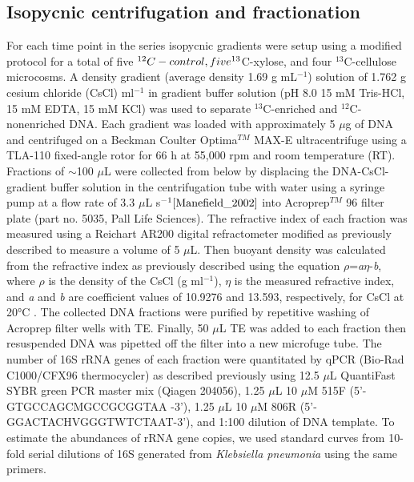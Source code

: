 \subsection{Isopycnic centrifugation and fractionation}
For each time point in the series isopycnic gradients were setup using
a modified protocol \cite{Neufeld_2007} for a total of five
$^{12}C-control, five \textsuperscript{13}$C-xylose, and four
$^{13}$C-cellulose microcosms. A density gradient (average density
1.69 g mL$^{-1}$) solution of 1.762 g cesium chloride (CsCl)
ml$^{-1}$ in gradient buffer solution (pH 8.0 15 mM Tris-HCl, 15
mM EDTA, 15 mM KCl) was used to separate $^{13}$C-enriched and
$^{12}$C-nonenriched DNA. Each gradient was loaded with
approximately 5 $\mu$g of DNA and centrifuged on a Beckman Coulter
Optima$^{TM}$ MAX-E ultracentrifuge using a TLA-110 fixed-angle
rotor for 66 h at 55,000 rpm and room temperature (RT). Fractions of $\sim$100
$\mu$L were collected from below by displacing the DNA-CsCl-gradient buffer
solution in the centrifugation tube with water using a syringe pump at a flow
rate of 3.3 $\mu$L s$^{-1} \cite{Manefield_2002}$ into
Acroprep$^{TM}$ 96 filter plate (part no. 5035, Pall Life
Sciences). The refractive index of each fraction was measured using a Reichart
AR200 digital refractometer modified as previously described
\cite{Buckley_2007} to measure a volume of 5 $\mu$L. Then buoyant density was
calculated from the refractive index as previously described
\cite{Buckley_2007} using the equation $\rho$=\textit{a}$\eta$-\textit{b},
where $\rho$ is the density of the CsCl (g ml$^{-1}$), $\eta$ is
the measured refractive index, and \textit{a} and \textit{b} are coefficient
values of 10.9276 and 13.593, respectively, for CsCl at 20°C
\cite{9780408708036}. The collected DNA fractions were purified by repetitive
washing of Acroprep filter wells with TE. Finally, 50 $\mu$L TE was added to
each fraction then resuspended DNA was pipetted off the filter into a new
microfuge tube. The number of 16S rRNA genes of each fraction were quantitated
by qPCR (Bio-Rad C1000/CFX96 thermocycler) as described previously
\cite{Berthrong_2013} using 12.5 $\mu$L QuantiFast SYBR green PCR  master mix
(Qiagen 204056), 1.25 $\mu$L 10 $\mu$M 515F (5'-GTGCCAGCMGCCGCGGTAA -3'), 1.25
$\mu$L 10 $\mu$M 806R (5'-GGACTACHVGGGTWTCTAAT-3'), and 1:100 dilution of DNA
template. To estimate the abundances of rRNA gene copies, we used standard
curves from 10-fold serial dilutions of 16S generated from \textit{Klebsiella
pneumonia} using the same primers.   

